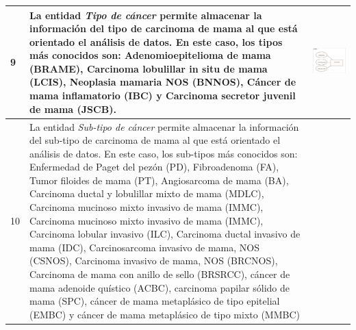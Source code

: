 \begin{table}[htb!]
	\footnotesize
	\begin{threeparttable}
		\begin{tabular}{p{0.5cm} p{7cm} p{7cm}} \toprule 
			9
			& La entidad \textit{Tipo de cáncer} permite almacenar la información del tipo de carcinoma de mama al que está orientado el análisis de datos.  En este caso, los tipos más conocidos son: Adenomioepitelioma de mama (BRAME), Carcinoma lobulillar in situ de mama (LCIS), Neoplasia mamaria NOS (BNNOS), Cáncer de mama inflamatorio (IBC) y Carcinoma secretor juvenil de mama (JSCB).
			& \begin{center}\includegraphics[width=1\linewidth]{MER/IMAGENES_MER/9_TIPO_CANCER}\end{center}
			\\ \hline
			10
			& La entidad \textit{Sub-tipo de cáncer} permite almacenar la información del sub-tipo de carcinoma de mama al que está orientado el análisis de datos. En este caso, los sub-tipos más conocidos son: Enfermedad de Paget del pezón (PD), Fibroadenoma (FA), Tumor filoides de mama (PT), Angiosarcoma de mama (BA), Carcinoma ductal y lobulillar mixto de mama (MDLC), Carcinoma mucinoso mixto invasivo de mama (IMMC), Carcinoma mucinoso mixto invasivo de mama (IMMC), Carcinoma lobular invasivo (ILC), Carcinoma ductal invasivo de mama (IDC), Carcinosarcoma invasivo de mama, NOS (CSNOS), Carcinoma invasivo de mama, NOS (BRCNOS), Carcinoma de mama con anillo de sello (BRSRCC), cáncer de mama adenoide quístico (ACBC), carcinoma papilar sólido de mama (SPC), cáncer de mama metaplásico de tipo epitelial (EMBC) y cáncer de mama metaplásico de tipo mixto (MMBC)

\end{tabular}
\end{threeparttable}
\end{table}
